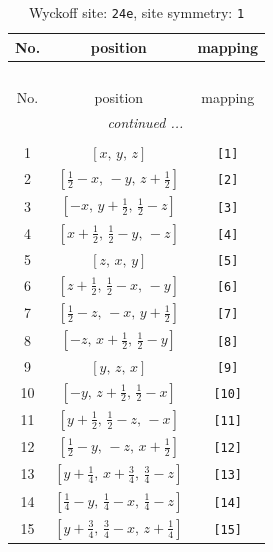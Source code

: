 \documentclass[fleqn,8pt]{jsarticle}
\begin{document}
\begin{longtable}{ccc}
\caption{Wyckoff site: {\tt 24e}, site symmetry: {\tt 1}}
 \\
 \hline \hline
No. & position & mapping \\ \hline \endfirsthead

\multicolumn{2}{l}{\tablename\ \thetable{}} \\
 \hline \hline
No. & position & mapping \\ \hline \endhead

 \hline \hline
\multicolumn{2}{r}{\footnotesize\it continued ...} \\ \endfoot

 \hline \hline
\multicolumn{2}{r}{} \\ \endlastfoot

1 & $\left[ x,\, y,\, z \right]$ & {\tt [1]} \\ \hline
2 & $\left[ \frac{1}{2} - x,\, - y,\, z + \frac{1}{2} \right]$ & {\tt [2]} \\ \hline
3 & $\left[ - x,\, y + \frac{1}{2},\, \frac{1}{2} - z \right]$ & {\tt [3]} \\ \hline
4 & $\left[ x + \frac{1}{2},\, \frac{1}{2} - y,\, - z \right]$ & {\tt [4]} \\ \hline
5 & $\left[ z,\, x,\, y \right]$ & {\tt [5]} \\ \hline
6 & $\left[ z + \frac{1}{2},\, \frac{1}{2} - x,\, - y \right]$ & {\tt [6]} \\ \hline
7 & $\left[ \frac{1}{2} - z,\, - x,\, y + \frac{1}{2} \right]$ & {\tt [7]} \\ \hline
8 & $\left[ - z,\, x + \frac{1}{2},\, \frac{1}{2} - y \right]$ & {\tt [8]} \\ \hline
9 & $\left[ y,\, z,\, x \right]$ & {\tt [9]} \\ \hline
10 & $\left[ - y,\, z + \frac{1}{2},\, \frac{1}{2} - x \right]$ & {\tt [10]} \\ \hline
11 & $\left[ y + \frac{1}{2},\, \frac{1}{2} - z,\, - x \right]$ & {\tt [11]} \\ \hline
12 & $\left[ \frac{1}{2} - y,\, - z,\, x + \frac{1}{2} \right]$ & {\tt [12]} \\ \hline
13 & $\left[ y + \frac{1}{4},\, x + \frac{3}{4},\, \frac{3}{4} - z \right]$ & {\tt [13]} \\ \hline
14 & $\left[ \frac{1}{4} - y,\, \frac{1}{4} - x,\, \frac{1}{4} - z \right]$ & {\tt [14]} \\ \hline
15 & $\left[ y + \frac{3}{4},\, \frac{3}{4} - x,\, z + \frac{1}{4} \right]$ & {\tt [15]} \\ \hline

\end{longtable}
\end{document}
